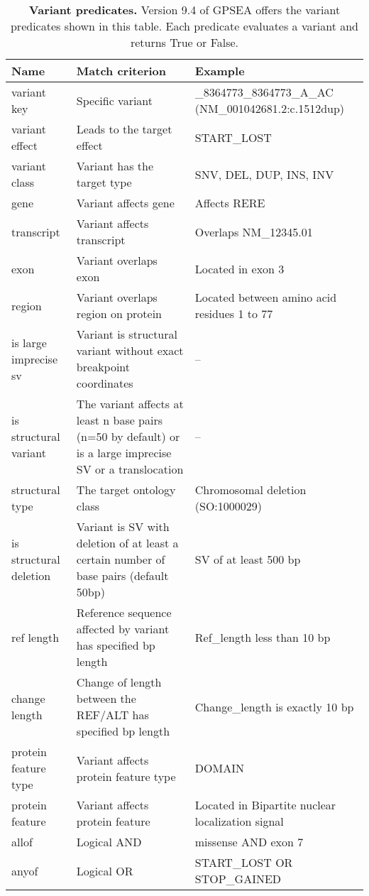\documentclass[12pt]{article}
\begin{document}
\thispagestyle{empty}

\begin{table}
\centering
\renewcommand{\arraystretch}{1.2} %
\begin{tabular}{l>{\raggedright\arraybackslash}p{6cm}>{\raggedright\arraybackslash}p{6cm}}
\toprule
\textbf{Name} & \textbf{Match criterion} & \textbf{Example}\\
\midrule
variant key & Specific variant & 1\_8364773\_8364773\_A\_AC (NM\_001042681.2:c.1512dup) \\
variant effect & Leads to the target effect & START\_LOST \\
variant class & Variant has the target type & SNV, DEL, DUP, INS, INV \\
gene & Variant affects gene & Affects RERE \\
transcript & Variant affects transcript & Overlaps NM\_12345.01 \\
exon & Variant overlaps exon & Located in exon 3 \\
region & Variant overlaps region on protein & Located between amino acid residues 1 to 77 \\
is large imprecise sv & Variant is structural variant without exact breakpoint coordinates & -- \\
is structural variant & The variant affects at least n base pairs (n=50 by default) or is a large imprecise SV or a translocation & -- \\
structural type & The target ontology class & Chromosomal deletion (SO:1000029) \\
is structural deletion & Variant is SV with deletion of at least a certain number of base pairs (default 50bp) & SV of at least 500 bp \\
ref length & Reference sequence affected by variant has specified bp length & Ref\_length less than 10 bp \\
change length & Change of length between the REF/ALT has specified bp length & Change\_length is exactly 10 bp \\
protein feature type & Variant affects protein feature type & DOMAIN \\
protein feature & Variant affects protein feature & Located in Bipartite nuclear localization signal \\
allof & Logical AND & missense AND exon 7 \\
anyof & Logical OR & START\_LOST OR STOP\_GAINED \\
\bottomrule
\end{tabular}
\caption{\textbf{Variant predicates.} Version 9.4 of GPSEA offers the variant predicates shown in this table. Each predicate evaluates a variant and returns True or False.}
\label{tab:varpredicates}
\end{table}
\clearpage
\newpage

\clearpage
\newpage
\end{document}
